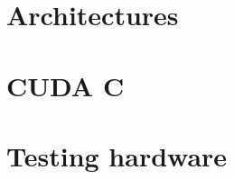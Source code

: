 \section{Architectures}\label{sec:gpu_arch}

\section{CUDA C}

\section{Testing hardware}\label{sec:benchmark}